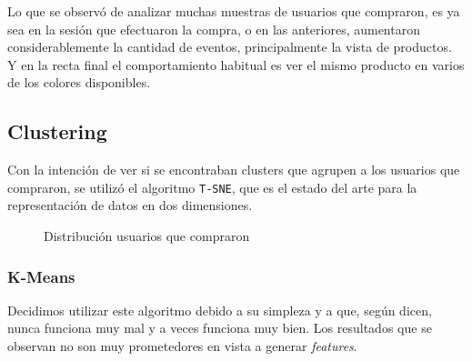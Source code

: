 \documentclass[a4paper]{article}
\begin{document}
Lo que se observó de analizar muchas muestras de usuarios que compraron, es ya sea en la sesión que efectuaron la compra, o en las anteriores, aumentaron considerablemente la cantidad de eventos, principalmente la vista de productos. Y en la recta final el comportamiento habitual es ver el mismo producto en varios de los colores disponibles.

\subsection{Clustering}

Con la intención de ver si se encontraban clusters que agrupen a los usuarios que compraron, se utilizó el algoritmo \texttt{T-SNE}, que es el estado del arte para la representación de datos en dos dimensiones.

\begin{figure}[!h]
	\caption{Distribución usuarios que compraron}
	\label{fig:mesdiasnormalizado}
\end{figure}

\subsubsection{K-Means}

Decidimos utilizar este algoritmo debido a su simpleza y a que, según dicen, nunca funciona muy mal y a veces funciona muy bien.
Los resultados que se observan no son muy prometedores en vista a generar \textit{features}.
\end{document}
